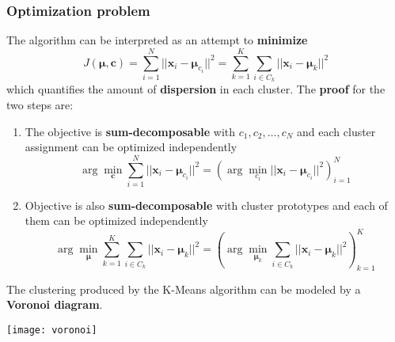 \subsubsection{Optimization problem}
The algorithm can be interpreted as an attempt to \textbf{minimize}
\begin{equation}
	J(\mathbf{\mu}, \mathbf{c}) = \sum_{i=1}^N\lvert\lvert \mathbf{x}_i - \mathbf{\mu}_{c_i}\rvert\rvert^2 = \sum_{k=1}^K\sum_{i\in C_k}\lvert\lvert \mathbf{x}_i - \mathbf{\mu}_{k}\rvert\rvert^2
\end{equation}
which quantifies the amount of \textbf{dispersion} in each cluster.
\newpage
\noindent The \textbf{proof} for the two steps are:
\begin{enumerate}
	\item The objective is \textbf{sum-decomposable} with $c_1, c_2, \ldots, c_N$ and each cluster assignment can be optimized independently
	\begin{equation*}
		\arg\min_\mathbf{c} \sum_{i=1}^N \lvert\lvert \mathbf{x}_i - \mathbf{\mu}_{c_i}\rvert\rvert^2 = (\arg\min_{c_i}\lvert\lvert \mathbf{x}_i - \mathbf{\mu}_{c_i}\rvert\rvert^2)^N_{i=1}
	\end{equation*}
	\item Objective is also \textbf{sum-decomposable} with cluster prototypes and each of them can be optimized independently
	\begin{equation*}
		\arg\min_\mathbf{\mu}\sum_{k=1}^K\sum_{i\in C_k}\lvert\lvert \mathbf{x}_i - \mathbf{\mu}_{k}\rvert\rvert^2 = (\arg\min_{\mathbf{\mu}_k}\sum_{i\in C_k}\lvert\lvert \mathbf{x}_i - \mathbf{\mu}_{k}\rvert\rvert^2)^K_{k=1}
	\end{equation*}
\end{enumerate}

\begin{note}
	The clustering produced by the K-Means algorithm can be modeled by a \textbf{Voronoi diagram}.
	\begin{center}
		\texttt{[image: voronoi]}
	\end{center}
\end{note}

